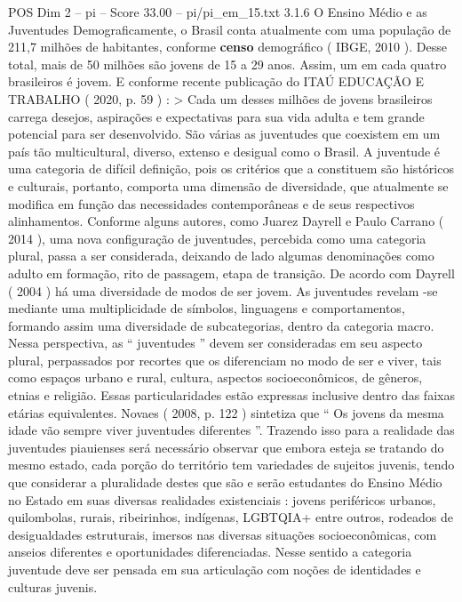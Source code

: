 \begin{textsample}{POS Dim 2 – pi – Score 33.00 – pi/pi\_em\_15.txt}  \label{ex:f2_pos_093}
3.1.6 O Ensino Médio e as Juventudes Demograficamente, o Brasil conta atualmente com uma população de 211,7 milhões de habitantes, conforme \textbf{censo} demográfico ( IBGE, 2010 ).
Desse total, mais de 50 milhões são jovens de 15 a 29 anos.
Assim, um em cada quatro brasileiros é jovem.
E conforme recente publicação do ITAÚ EDUCAÇÃO E TRABALHO ( 2020, p. 59 ) : > Cada um desses milhões de jovens brasileiros carrega desejos, aspirações e expectativas para sua vida adulta e tem grande potencial para ser desenvolvido.
São várias as juventudes que coexistem em um país tão multicultural, diverso, extenso e desigual como o Brasil.
A juventude é uma categoria de difícil definição, pois os critérios que a constituem são históricos e culturais, portanto, comporta uma dimensão de diversidade, que atualmente se modifica em função das necessidades contemporâneas e de seus respectivos alinhamentos.
Conforme alguns autores, como Juarez Dayrell e Paulo Carrano ( 2014 ), uma nova configuração de juventudes, percebida como uma categoria plural, passa a ser considerada, deixando de lado algumas denominações como adulto em formação, rito de passagem, etapa de transição.
De acordo com Dayrell ( 2004 ) há uma diversidade de modos de ser jovem.
As juventudes revelam -se mediante uma multiplicidade de símbolos, linguagens e comportamentos, formando assim uma diversidade de subcategorias, dentro da categoria macro.
Nessa perspectiva, as “ juventudes ” devem ser consideradas em seu aspecto plural, perpassados por recortes que os diferenciam no modo de ser e viver, tais como espaços urbano e rural, cultura, aspectos socioeconômicos, de gêneros, etnias e religião.
Essas particularidades estão expressas inclusive dentro das faixas etárias equivalentes.
Novaes ( 2008, p. 122 ) sintetiza que “ Os jovens da mesma idade vão sempre viver juventudes diferentes ”.
Trazendo isso para a realidade das juventudes piauienses será necessário observar que embora esteja se tratando do mesmo estado, cada porção do território tem variedades de sujeitos juvenis, tendo que considerar a pluralidade destes que são e serão estudantes do Ensino Médio no Estado em suas diversas realidades existenciais : jovens periféricos urbanos, quilombolas, rurais, ribeirinhos, indígenas, LGBTQIA+ entre outros, rodeados de desigualdades estruturais, imersos nas diversas situações socioeconômicas, com anseios diferentes e oportunidades diferenciadas.
Nesse sentido a categoria juventude deve ser pensada em sua articulação com noções de identidades e culturas juvenis.

\end{textsample}

